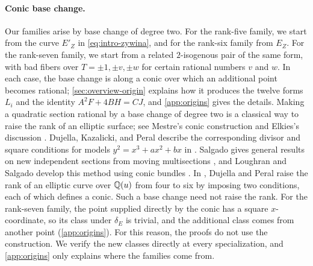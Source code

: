 \paragraph{Conic base change.} Our families arise by base change of degree two. For the rank-five family, we start from the curve $E'_Z$ in \eqref{eq:intro-zywina}, and for the rank-six family from $E_Z$. For the rank-seven family, we start from a related $2$-isogenous pair of the same form, with bad fibers over $T=\pm1,\pm v,\pm w$ for certain rational numbers $v$ and $w$. In each case, the base change is along a conic over which an additional point becomes rational; \cref{sec:overview-origin} explains how it produces the twelve forms $L_i$ and the identity $A^2F+4BH=CJ$, and \cref{app:origins} gives the details. Making a quadratic section rational by a base change of degree two is a classical way to raise the rank of an elliptic surface; see Mestre's conic construction \cite[\S2.2]{Mestre1991} and Elkies's discussion \cite[Lecture~III, p.~2003]{Elkies2007}. Dujella, Kazalicki, and Peral describe the corresponding divisor and square conditions for models $y^2=x^3+ax^2+bx$ in \cite[\S1.1]{DujellaKazalickiPeral2021}. Salgado gives general results on new independent sections from moving multisections \cite[Corollary~4.3]{Salgado2012}, and Loughran and Salgado develop this method using conic bundles \cite[\S1.2 and Theorem~2.4]{LoughranSalgado2022}. In \cite[\S4]{DujellaPeral2024}, Dujella and Peral raise the rank of an elliptic curve over $\mathbb Q(u)$ from four to six by imposing two conditions, each of which defines a conic. Such a base change need not raise the rank. For the rank-seven family, the point supplied directly by the conic has a square $x$-coordinate, so its class under $\delta_E$ is trivial, and the additional class comes from another point (\cref{app:origins}). For this reason, the proofs do not use the construction. We verify the new classes directly at every specialization, and \cref{app:origins} only explains where the families come from.

